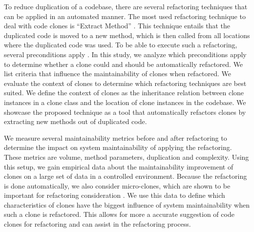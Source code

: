 \documentclass[a4paper,UKenglish,cleveref, autoref, thm-restate,authorcolumns]{lipics-v2019}
\begin{document}
To reduce duplication of a codebase, there are several refactoring techniques that can be applied in an automated manner. The most used refactoring technique to deal with code clones is ``Extract Method'' \cite{fowler2018refactoring}. This technique entails that the duplicated code is moved to a new method, which is then called from all locations where the duplicated code was used. To be able to execute such a refactoring, several preconditions apply \cite{tsantalis2015assessing}.
In this study, we analyze which preconditions apply to determine whether a clone could and should be automatically refactored. We list criteria that influence the maintainability of clones when refactored. We evaluate the context of clones to determine which refactoring techniques are best suited. We define the context of clones as the inheritance relation between clone instances in a clone class and the location of clone instances in the codebase. We showcase the proposed technique as a tool that automatically refactors clones by extracting new methods out of duplicated code.

We measure several maintainability metrics before and after refactoring to determine the impact on system maintainability of applying the refactoring. These metrics are volume, method parameters, duplication and complexity. Using this setup, we gain empirical data about the maintainability improvement of clones on a large set of data in a controlled environment. Because the refactoring is done automatically, we also consider micro-clones, which are shown to be important for refactoring consideration \cite{mondai2018micro}. We use this data to define which characteristics of clones have the biggest influence of system maintainability when such a clone is refactored. This allows for more a accurate suggestion of code clones for refactoring and can assist in the refactoring process.
\end{document}
